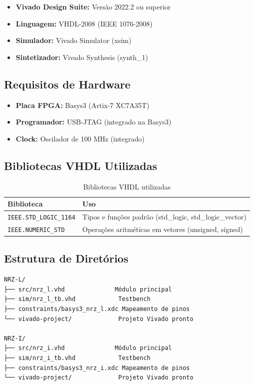 \documentclass[11pt,a4paper]{article}
\begin{document}
\begin{itemize}
    \item \textbf{Vivado Design Suite:} Versão 2022.2 ou superior
    \item \textbf{Linguagem:} VHDL-2008 (IEEE 1076-2008)
    \item \textbf{Simulador:} Vivado Simulator (xsim)
    \item \textbf{Sintetizador:} Vivado Synthesis (synth\_1)
\end{itemize}

\subsection{Requisitos de Hardware}

\begin{itemize}
    \item \textbf{Placa FPGA:} Basys3 (Artix-7 XC7A35T)
    \item \textbf{Programador:} USB-JTAG (integrado na Basys3)
    \item \textbf{Clock:} Oscilador de 100 MHz (integrado)
\end{itemize}

\subsection{Bibliotecas VHDL Utilizadas}

\begin{table}[H]
\centering
\begin{tabularx}{\textwidth}{|l|X|}
\hline
\textbf{Biblioteca} & \textbf{Uso} \\
\hline
\texttt{IEEE.STD\_LOGIC\_1164} & Tipos e funções padrão (std\_logic, std\_logic\_vector) \\
\hline
\texttt{IEEE.NUMERIC\_STD} & Operações aritméticas em vetores (unsigned, signed) \\
\hline
\end{tabularx}
\caption{Bibliotecas VHDL utilizadas}
\end{table}

\subsection{Estrutura de Diretórios}

\begin{lstlisting}
NRZ-L/
├── src/nrz_l.vhd              Módulo principal
├── sim/nrz_l_tb.vhd            Testbench
├── constraints/basys3_nrz_l.xdc Mapeamento de pinos
└── vivado-project/             Projeto Vivado pronto

NRZ-I/
├── src/nrz_i.vhd              Módulo principal
├── sim/nrz_i_tb.vhd            Testbench
├── constraints/basys3_nrz_i.xdc Mapeamento de pinos
└── vivado-project/             Projeto Vivado pronto
\end{lstlisting}
\end{document}
